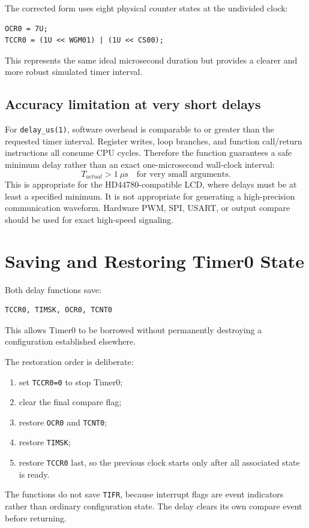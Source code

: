 \documentclass[11pt,a4paper]{article}
\begin{document}
The corrected form uses eight physical counter states at the undivided clock:
\begin{lstlisting}[style=cstyle]
OCR0 = 7U;
TCCR0 = (1U << WGM01) | (1U << CS00);
\end{lstlisting}
This represents the same ideal microsecond duration but provides a clearer and more robust simulated timer interval.

\subsection{Accuracy limitation at very short delays}
For \texttt{delay\_us(1)}, software overhead is comparable to or greater than the requested timer interval. Register writes, loop branches, and function call/return instructions all consume CPU cycles. Therefore the function guarantees a safe minimum delay rather than an exact one-microsecond wall-clock interval:
\[
T_{actual}>1\ \mu\text{s}\quad\text{for very small arguments}.
\]
This is appropriate for the HD44780-compatible LCD, where delays must be at least a specified minimum. It is not appropriate for generating a high-precision communication waveform. Hardware PWM, SPI, USART, or output compare should be used for exact high-speed signaling.

\section{Saving and Restoring Timer0 State}
Both delay functions save:
\begin{lstlisting}[style=cstyle]
TCCR0, TIMSK, OCR0, TCNT0
\end{lstlisting}
This allows Timer0 to be borrowed without permanently destroying a configuration established elsewhere.

The restoration order is deliberate:
\begin{enumerate}
  \item set \texttt{TCCR0=0} to stop Timer0;
  \item clear the final compare flag;
  \item restore \texttt{OCR0} and \texttt{TCNT0};
  \item restore \texttt{TIMSK};
  \item restore \texttt{TCCR0} last, so the previous clock starts only after all associated state is ready.
\end{enumerate}

The functions do not save \texttt{TIFR}, because interrupt flags are event indicators rather than ordinary configuration state. The delay clears its own compare event before returning.
\end{document}
